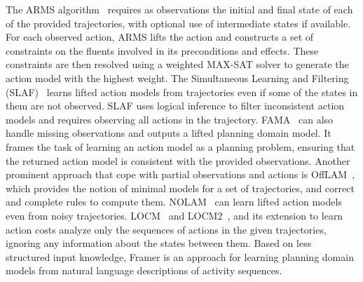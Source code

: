 \documentclass{article}
\theoremstyle{definition}
\theoremstyle{remark}
\newif\ifaddcomments
\newcommand{\leo}[1]{\ifaddcomments{\textcolor{pink}{[Leonardo: #1]}}\fi}
\begin{document}
The ARMS algorithm~\citep{yang2007learning} requires as observations the initial and final state of each of the provided trajectories, with optional use of intermediate states if available. For each observed action, ARMS lifts the action and constructs a set of constraints on the fluents involved in its preconditions and effects. These constraints are then resolved using a weighted MAX-SAT solver to generate the action model with the highest weight.
The Simultaneous Learning and Filtering (SLAF)~\citep{amir2008learning} learns lifted action models from trajectories even if some of the states in them are not observed. 
SLAF uses logical inference to filter inconsistent action models and requires observing all actions in the trajectory.  
FAMA~\citep{aineto2019learning} can also handle missing observations and outputs a lifted planning domain model. 
It frames the task of learning an action model as a planning problem, ensuring that the returned action model is consistent with the provided observations.
Another prominent approach that cope with partial observations and actions is OffLAM~\citep{LAMANNA2025104256}, which provides the notion of minimal models for a set of trajectories, and correct and complete rules to compute them.
NOLAM~\citep{Lamanna24} can learn lifted action models even from noisy trajectories. 
LOCM~\citep{cresswell2011generalised} and LOCM2~\citep{cresswell2013acquiring}, and its extension to learn action costs \citep{gregory2016domain} analyze only the sequences of actions in the given trajectories, ignoring any information about the states between them. 
Based on less structured input knowledge, Framer \citep{lindsay2017framer} is an approach for learning planning domain models from natural language descriptions of activity sequences.
\end{document}
